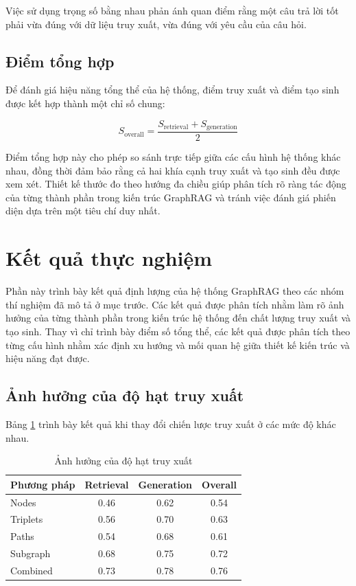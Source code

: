 Việc sử dụng trọng số bằng nhau phản ánh quan điểm rằng một câu trả lời tốt phải vừa đúng với dữ liệu truy xuất, vừa đúng với yêu cầu của câu hỏi.

\subsection{Điểm tổng hợp}

Để đánh giá hiệu năng tổng thể của hệ thống, điểm truy xuất và điểm tạo sinh được kết hợp thành một chỉ số chung:

\begin{equation}
S_{\text{overall}} =
\frac{S_{\text{retrieval}} + S_{\text{generation}}}{2}
\end{equation}

Điểm tổng hợp này cho phép so sánh trực tiếp giữa các cấu hình hệ thống khác nhau, đồng thời đảm bảo rằng cả hai khía cạnh truy xuất và tạo sinh đều được xem xét. Thiết kế thước đo theo hướng đa chiều giúp phân tích rõ ràng tác động của từng thành phần trong kiến trúc GraphRAG và tránh việc đánh giá phiến diện dựa trên một tiêu chí duy nhất.

\section{Kết quả thực nghiệm}

Phần này trình bày kết quả định lượng của hệ thống GraphRAG theo các nhóm thí nghiệm đã mô tả ở mục trước. Các kết quả được phân tích nhằm làm rõ ảnh hưởng của từng thành phần trong kiến trúc hệ thống đến chất lượng truy xuất và tạo sinh. Thay vì chỉ trình bày điểm số tổng thể, các kết quả được phân tích theo từng cấu hình nhằm xác định xu hướng và mối quan hệ giữa thiết kế kiến trúc và hiệu năng đạt được.

\subsection{Ảnh hưởng của độ hạt truy xuất}

Bảng \ref{tab:granularity_results} trình bày kết quả khi thay đổi chiến lược truy xuất ở các mức độ khác nhau.

\begin{table}[h]
\centering
\caption{Ảnh hưởng của độ hạt truy xuất}
\label{tab:granularity_results}
\begin{tabular}{lccc}
\hline
\textbf{Phương pháp} & \textbf{Retrieval} & \textbf{Generation} & \textbf{Overall} \\
\hline
Nodes      & 0.46 & 0.62 & 0.54 \\
Triplets   & 0.56 & 0.70 & 0.63 \\
Paths      & 0.54 & 0.68 & 0.61 \\
Subgraph   & 0.68 & 0.75 & 0.72 \\
Combined   & 0.73 & 0.78 & 0.76 \\
\hline
\end{tabular}
\end{table}

